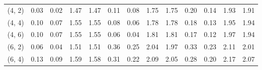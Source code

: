 \begin{tabular}{lrrrrrrrrrrrr}
(4, 2)        &                                               0.03 &                                            0.02 &                            1.47 &                                  1.47 &                                               0.11 &                                            0.08 &                            1.75 &                                  1.75 &                                               0.20 &                                            0.14 &                            1.93 &                                  1.91 \\
(4, 4)        &                                               0.10 &                                            0.07 &                            1.55 &                                  1.55 &                                               0.08 &                                            0.06 &                            1.78 &                                  1.78 &                                               0.18 &                                            0.13 &                            1.95 &                                  1.94 \\
(4, 6)        &                                               0.10 &                                            0.07 &                            1.55 &                                  1.55 &                                               0.06 &                                            0.04 &                            1.81 &                                  1.81 &                                               0.17 &                                            0.12 &                            1.97 &                                  1.94 \\
(6, 2)        &                                               0.06 &                                            0.04 &                            1.51 &                                  1.51 &                                               0.36 &                                            0.25 &                            2.04 &                                  1.97 &                                               0.33 &                                            0.23 &                            2.11 &                                  2.01 \\
(6, 4)        &                                               0.13 &                                            0.09 &                            1.59 &                                  1.58 &                                               0.31 &                                            0.22 &                            2.09 &                                  2.05 &                                               0.28 &                                            0.20 &                            2.17 &                                  2.07 \\

\end{tabular}
